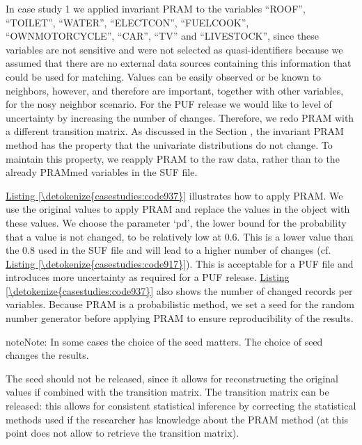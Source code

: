 \documentclass[letterpaper,10pt,english]{sphinxmanual}
\begin{document}
In case study 1 we applied invariant PRAM to the variables “ROOF”,
“TOILET”, “WATER”, “ELECTCON”, “FUELCOOK”, “OWNMOTORCYCLE”, “CAR”, “TV”
and “LIVESTOCK”, since these variables are not sensitive and were not
selected as quasi-identifiers because we assumed that there are no
external data sources containing this information that could be used for
matching. Values can be easily observed or be known to neighbors,
however, and therefore are important, together with other variables, for
the nosy neighbor scenario. For the PUF release we would like to level
of uncertainty by increasing the number of changes. Therefore, we redo
PRAM with a different transition matrix. As discussed in the Section
,
the invariant PRAM method has the property that the univariate
distributions do not change. To maintain this property, we reapply PRAM
to the raw data, rather than to the already PRAMmed variables in the SUF
file.

\hyperref[\detokenize{casestudies:code937}]{Listing \ref{\detokenize{casestudies:code937}}} illustrates how to apply PRAM. We use the original values
to apply PRAM and replace the values in the  object with these
values. We choose the parameter ‘pd’, the lower bound for the
probability that a value is not changed, to be relatively low at 0.6.
This is a lower value than the 0.8 used in the SUF file and will lead to
a higher number of changes (cf. \hyperref[\detokenize{casestudies:code917}]{Listing \ref{\detokenize{casestudies:code917}}}). This is
acceptable for a PUF file and introduces more uncertainty as required
for a PUF release. \hyperref[\detokenize{casestudies:code937}]{Listing \ref{\detokenize{casestudies:code937}}} also shows the number of changed records
per variables. Because PRAM is a probabilistic method, we set a seed for
the random number generator before applying PRAM to ensure
reproducibility of the results.

\begin{sphinxadmonition}{note}{Note:}
In some cases the choice of the seed matters. The choice of seed changes the results.
\end{sphinxadmonition}

The seed should not be released, since it allows for reconstructing the original values
if combined with the transition matrix. The transition matrix can be
released: this allows for consistent statistical inference by correcting
the statistical methods used if the researcher has knowledge about the
PRAM method (at this point  does not allow to retrieve the
transition matrix).
\end{document}
